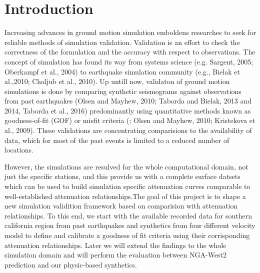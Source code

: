 \section{Introduction}

Increasing advances in ground motion simulation emboldens researches to seek for reliable methods of simulation validation. Validation is an effort to check the correctness of the formulation and the accuracy with respect to observations. The concept of simulation has found its way from systems science  (e.g. Sargent, 2005; Oberkampf et al., 2004) to earthquake simulation community (e.g., Bielak et al.,2010; Chaljub et al., 2010). Up untill now, validaton of ground motion simulations is done by comparing synthetic seismograms against observations from past earthquakes (Olsen and Mayhew, 2010; Taborda and Bielak, 2013 and 2014, Taborda et al., 2016) predominantly using quantitative methods known as goodness-of-fit (GOF) or misfit criteria (\citet{Anderson_2004_Proc}; Olsen and Mayhew, 2010; Kristekova et al., 2009). These validations are concentrating comparisions to the availability of data, which for most of the past events is limited to a reduced number of locations.\par
However, the simulations are resulved for the whole computational domain, not just the specific stations, and this provide us with a complete surface datsets which can be used to build simulation specific attenuation curves comparable to well-established attenuation relationships.The goal of this project is to shape a new simulation validition framework based on comparision with attenuation relationships. To this end, we start with the available recorded data for southern california region from past earthquakes and synthetics from four different velocity model to define and calibrate a goodness of fit criteria using their corrisponding attenuation relationships. Later we will extend the findings to the whole simulation domain and will perform the evaluation between NGA-West2 prediction and our physic-based synthetics.  
